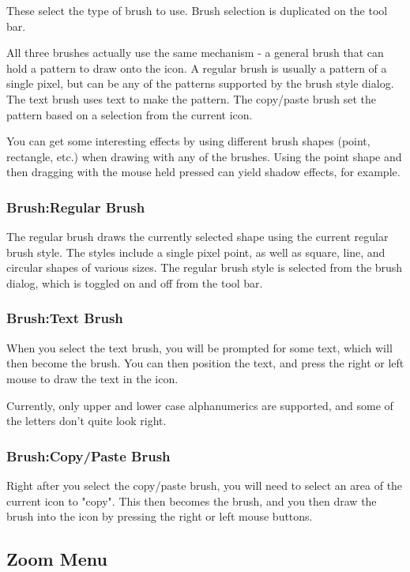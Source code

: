 These select the type of brush to use. Brush selection
is duplicated on the tool bar.

All three brushes actually use the same mechanism -
a general brush that can hold a pattern to draw
onto the icon. A regular brush is usually a pattern
of a single pixel, but can be any of the patterns
supported by the brush style dialog. The text
brush uses text to make the pattern. The copy/paste
brush set the pattern based on a selection
from the current icon.

You can get some interesting effects by using different
brush shapes (point, rectangle, etc.) when drawing with
any of the brushes. Using the point shape and then dragging
with the mouse held pressed can yield shadow effects,
for example.

\subsubsection* {Brush:Regular Brush}

The regular brush draws the currently selected shape
using the current regular brush style. The styles
include a single pixel point, as well as square, line, and
circular shapes of various sizes. The regular brush
style is selected from the brush dialog, which is
toggled on and off from the tool bar.

\subsubsection* {Brush:Text Brush}

When you select the text brush, you will be prompted
for some text, which will then become the brush.
You can then position the text, and press the right or
left mouse to draw the text in the icon.

Currently, only upper and lower case alphanumerics are
supported, and some of the letters don't quite look right.

\subsubsection* {Brush:Copy/Paste Brush}

Right after you select the copy/paste brush, you will
need to select an area of the current icon to "copy".
This then becomes the brush, and you then draw the brush
into the icon by pressing the right or left mouse buttons.


\subsection{Zoom Menu}


